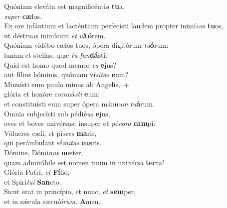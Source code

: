\evenverse Quóniam eleváta est magnificénti\textit{a} \textbf{tu}a,~\*\\
\evenverse \textit{su}\textit{per} \textbf{cæ}los.\\
\oddverse Ex ore infántium et lacténtium perfecísti laudem propter inimí\textit{cos} \textbf{tu}os,~\*\\
\oddverse ut déstruas inimícum \textit{et} \textit{ul}\textbf{tó}rem.\\
\evenverse Quóniam vidébo cælos tuos, ópera digitórum \textit{tu}\textbf{ó}rum:~\*\\
\evenverse lunam et stellas, quæ \textit{tu} \textit{fun}\textbf{dá}sti.\\
\oddverse Quid est homo quod memor \textit{es} \textbf{e}jus?~\*\\
\oddverse aut fílius hóminis, quóniam ví\textit{si}\textit{tas} \textbf{e}um?\\
\evenverse Minuísti eum paulo minus ab Angelis,~+\\
\evenverse  glória et honóre coroná\textit{sti} \textbf{e}um:~\*\\
\evenverse et constituísti eum super ópera mánu\textit{um} \textit{tu}\textbf{á}rum.\\
\oddverse Omnia subjecísti sub pédi\textit{bus} \textbf{e}jus,~\*\\
\oddverse oves et boves univérsas: ínsuper et pé\textit{co}\textit{ra} \textbf{cam}pi.\\
\evenverse Vólucres cæli, et pi\textit{sces} \textbf{ma}ris,~\*\\
\evenverse qui perámbulant sé\textit{mi}\textit{tas} \textbf{ma}ris.\\
\oddverse Dómine, Dómi\textit{nus} \textbf{no}ster,~\*\\
\oddverse quam admirábile est nomen tuum in uni\textit{vér}\textit{sa} \textbf{ter}ra!\\
\evenverse Glória Patri, \textit{et} \textbf{Fí}lio,~\*\\
\evenverse et Spirí\textit{tu}\textit{i} \textbf{San}cto.\\
\oddverse Sicut erat in princípio, et nunc, \textit{et} \textbf{sem}per,~\*\\
\oddverse et in sǽcula sæcu\textit{ló}\textit{rum}. \textbf{A}men.\\
